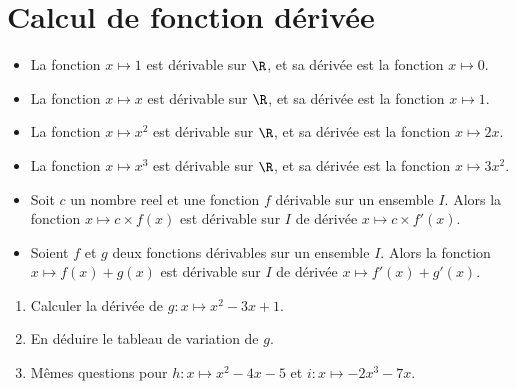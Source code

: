\documentclass{article}
\begin{document}
\section{Calcul de fonction dérivée}
\begin{tcolorbox}
\begin{proposition}
\hfill

\begin{itemize}
\item La fonction $x \mapsto 1$ est dérivable sur $\R$, et sa dérivée est la fonction $x \mapsto 0$. 
\item La fonction $x \mapsto x$ est dérivable sur $\R$, et sa dérivée est la fonction $x \mapsto 1$. 
\item La fonction $x \mapsto x^2$ est dérivable sur $\R$, et sa dérivée est la fonction $x \mapsto 2x$. 
\item La fonction $x \mapsto x^3$ est dérivable sur $\R$, et sa dérivée est la fonction $x \mapsto 3x^2$. 
\end{itemize}
\end{proposition}
\end{tcolorbox}
\begin{tcolorbox}
\begin{proposition}
\hfill

\begin{itemize}
\item Soit $c$ un nombre reel et une fonction $f$ dérivable sur un ensemble $I$. Alors la fonction $x \mapsto c \times f(x)$ est dérivable sur $I$ de dérivée $x \mapsto c \times f'(x)$.
\item Soient $f$ et $g$ deux fonctions dérivables sur un ensemble $I$. Alors la fonction $x \mapsto f(x) + g(x)$ est dérivable sur $I$ de dérivée $x \mapsto f'(x) + g'(x)$. 
\end{itemize}
\end{proposition}
\end{tcolorbox}
\begin{enumerate}
\item Calculer la dérivée de $g : x \mapsto x^2 - 3x + 1$.

\answersline

\item En déduire le tableau de variation de $g$.
\begin{center}
\end{center}
\item Mêmes questions pour $h : x \mapsto x^2 - 4x - 5$ et $i : x \mapsto -2x^3 - 7x$.
\end{enumerate}
\end{document}
